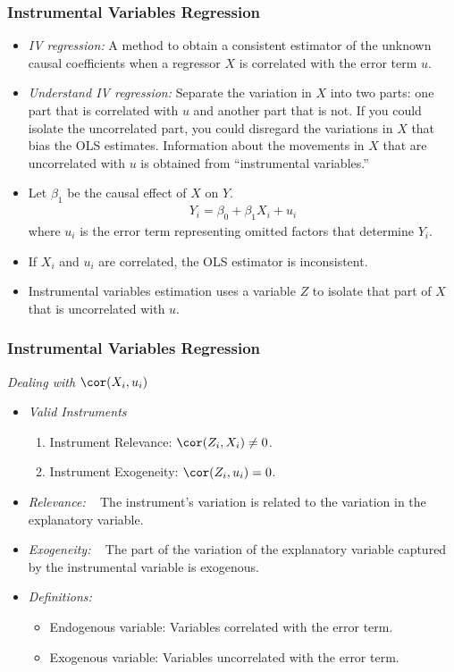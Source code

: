 

\begin{frame}
\frametitle{Instrumental Variables Regression}
\begin{itemize}
\item \emph{IV regression:} A method to obtain a consistent estimator of the unknown causal coefficients when a regressor $X$ is correlated with the error term $u$.
\item \emph{Understand IV regression:} Separate the variation in $X$ into two parts: one part that is correlated with $u$ and another part that is not. If you could isolate the uncorrelated part, you could disregard the variations in $X$ that bias the OLS estimates. Information about the movements in $X$ that are uncorrelated with $u$ is obtained from ``instrumental variables.'' 
\item Let $\beta_{1}$ be the causal effect of $X$ on $Y$.
\begin{align*}
Y_{i} = \beta_{0} + \beta_{1} X_{i} + u_{i}
\end{align*}
where $u_{i}$ is the error term representing omitted factors that determine $Y_{i}$.
\item If $X_{i}$ and $u_{i}$ are correlated, the OLS estimator is inconsistent. 
\item Instrumental variables estimation uses a variable $Z$ to isolate that part of $X$ that is uncorrelated with $u$.
\end{itemize}
\end{frame}


\begin{frame}
\frametitle{Instrumental Variables Regression}
\emph{Dealing with $\cor(X_{i}, u_{i})$}
\begin{itemize}
\item \emph{Valid Instruments}
\begin{enumerate}
\item Instrument Relevance:
\quad
$\cor(Z_{i}, X_{i}) \ne 0$.
\item Instrument Exogeneity:
\quad
$\cor(Z_{i}, u_{i}) = 0$.
\end{enumerate}
\item \emph{Relevance:} ~
The instrument's variation is related to the variation in the explanatory variable.
\item \emph{Exogeneity:} ~
The part of the variation of the explanatory variable captured by the instrumental variable is exogenous.
\item \emph{Definitions:}
\begin{itemize}
\item Endogenous variable:
Variables correlated with the error term.
\item Exogenous variable:
Variables uncorrelated with the error term.
\end{itemize}
\end{itemize}
\end{frame}
